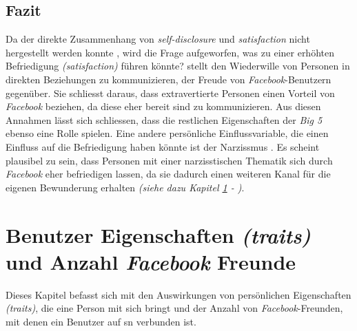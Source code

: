 \subsection{Fazit}\label{subsec.amountFazit}
Da der direkte Zusammenhang von \textit{self-disclosure} und \textit{satisfaction} nicht hergestellt werden konnte \cite{Special:2012}, wird die Frage aufgeworfen, was zu einer erhöhten Befriedigung \textit{(satisfaction)} führen könnte?  stellt den Wiederwille von Personen in direkten Beziehungen zu kommunizieren, der Freude von \textit{Facebook}-Benutzern gegenüber. Sie schliesst daraus, dass extravertierte Personen einen Vorteil von \textit{Facebook} beziehen, da diese eher bereit sind zu kommunizieren. Aus diesen Annahmen lässt sich schliessen, dass die restlichen Eigenschaften der \textit{Big 5} ebenso eine Rolle spielen.\newline
Eine andere persönliche Einflussvariable, die einen Einfluss auf die Befriedigung haben könnte ist der Narzissmus \cite{Special:2012}. Es scheint plausibel zu sein, dass Personen mit einer narzisstischen Thematik sich durch \textit{Facebook} eher befriedigen lassen, da sie dadurch einen weiteren Kanal für die eigenen Bewunderung erhalten \textit{(siehe dazu Kapitel \ref{sub.traits} - )}.

\section{Benutzer Eigenschaften \textit{(traits)} und Anzahl \textit{Facebook} Freunde}\label{sub.traits}
Dieses Kapitel befasst sich mit den Auswirkungen von persönlichen Eigenschaften \textit{(traits)}, die eine Person mit sich bringt und der Anzahl von \textit{Facebook}-Freunden, mit denen ein Benutzer auf \gls{sn} verbunden ist.

